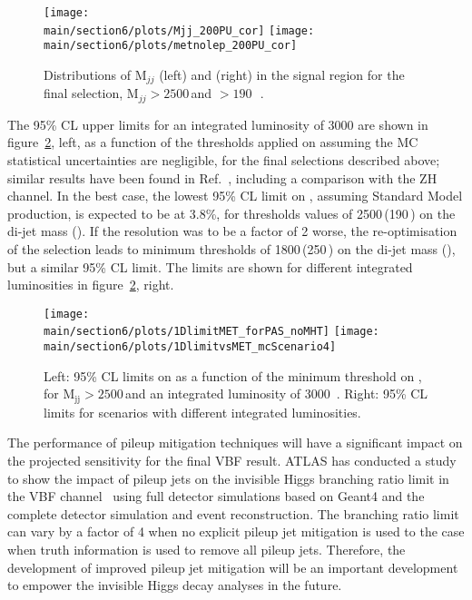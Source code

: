 \documentclass[../report.tex]{subfiles}
\providecommand{\main}{..}
\begin{document}
\begin{figure}[htbp]
  \centering
    \texttt{[image: \\main/section6/plots/Mjj\_200PU\_cor]}
    \texttt{[image: \\main/section6/plots/metnolep\_200PU\_cor]}
\caption{Distributions of M$_{jj}$ (left) and \MET (right) in the signal region for the final selection, M$_{jj}>2500$\,\UGeV and \MET$>190$\,\UGeV~\cite{CMS-PAS-FTR-18-016}.}
  \label{fig:plotsdijetmet}
\end{figure}

The 95\% CL upper limits for an integrated luminosity of 3000\fbinv
are shown in figure~\ref{fig:1Dlimits}, left, as a function of the
thresholds applied on \MET assuming the MC statistical uncertainties
are negligible, for the final selections described above; similar results have been found in Ref.~\cite{Biekotter:2017gyu}, including a comparison with the ZH channel. In the best
case, the lowest 95\% CL limit on \BHinv, assuming Standard Model
production, is expected to be at 3.8\%, for thresholds values of
2500\,\UGeV (190\,\UGeV) on the di-jet mass (\MET). If the \MET resolution
was to be a factor of 2 worse, the re-optimisation of the selection
leads to minimum thresholds of 1800\,\UGeV (250\,\UGeV) on the di-jet mass
(\MET), but a similar 95\% CL limit. The limits are shown for
different integrated luminosities in figure~\ref{fig:1Dlimits}, right.


\begin{figure}[htbp]
  \centering
    \texttt{[image: \\main/section6/plots/1DlimitMET\_forPAS\_noMHT]}
    \hfill
    \texttt{[image: \\main/section6/plots/1DlimitvsMET\_mcScenario4]}
\caption{Left: 95\% CL limits on \BHinv as a function of the minimum threshold on \MET, for M$_{\text{jj}}>2500$\,\UGeV and an integrated luminosity of 3000\fbinv ~\cite{CMS-PAS-FTR-18-016}. Right: 95\% CL limits for scenarios with different integrated luminosities.}
  \label{fig:1Dlimits}
\end{figure}


The performance of pileup mitigation techniques will have a significant impact on the projected sensitivity for the final VBF result. ATLAS has conducted a study to show the impact of pileup jets on the invisible Higgs branching ratio limit in the VBF channel~\cite{ATL-PHYS-PUB-2018-038} using full detector simulations based on Geant4\cite{Agostinelli:2002hh,Allison:2006ve} and the complete detector simulation and event reconstruction. The branching ratio limit can vary by a factor of 4 when no explicit pileup jet mitigation is used to the case when truth information is used to remove all pileup jets. Therefore, the development of improved pileup jet mitigation will be an important development to empower the invisible Higgs decay analyses in the future.
\end{document}
